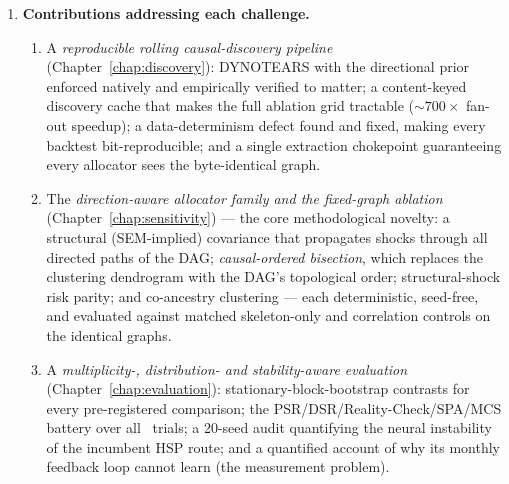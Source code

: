 \begin{enumerate}
  \item \textbf{Contributions addressing each challenge.}
  \begin{enumerate}[label=\textbf{A\arabic*}]
    \item A \emph{reproducible rolling causal-discovery pipeline}
      (Chapter~\ref{chap:discovery}): DYNOTEARS with the directional prior
      enforced natively and empirically verified to matter; a content-keyed
      discovery cache that makes the full ablation grid tractable
      (${\sim}700\times$ fan-out speedup); a data-determinism defect found and
      fixed, making every backtest bit-reproducible; and a single extraction
      chokepoint guaranteeing every allocator sees the byte-identical graph.
    \item The \emph{direction-aware allocator family and the fixed-graph
      ablation} (Chapter~\ref{chap:sensitivity}) --- the core methodological
      novelty: a structural (SEM-implied) covariance that propagates shocks
      through all directed paths of the DAG; \emph{causal-ordered bisection},
      which replaces the clustering dendrogram with the DAG's topological
      order; structural-shock risk parity; and co-ancestry clustering ---
      each deterministic, seed-free, and evaluated against matched
      skeleton-only and correlation controls on the identical graphs.
    \item A \emph{multiplicity-, distribution- and stability-aware evaluation}
      (Chapter~\ref{chap:evaluation}): stationary-block-bootstrap contrasts
      for every pre-registered comparison; the PSR/DSR/Reality-Check/SPA/MCS
      battery over all \rsNtrials\ trials; a 20-seed audit quantifying the
      neural instability of the incumbent HSP route; and a quantified account
      of why its monthly feedback loop cannot learn (the measurement
      problem).
  \end{enumerate}


\end{enumerate}
